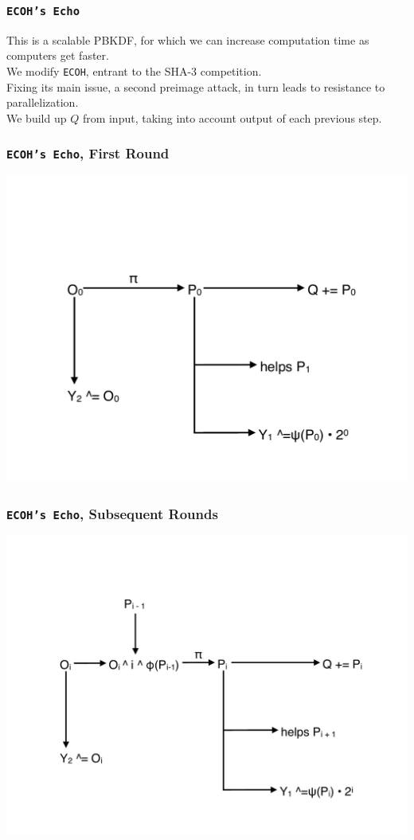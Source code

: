 \documentclass[xcolor=dvipsnames, handout]{beamer}
\begin{document}
\begin{frame}
    \frametitle{\texttt{ECOH's Echo}}
    This is a scalable PBKDF, for which we can increase computation time as
        computers get faster.\\
    We modify \texttt{ECOH}, entrant to the SHA-3 competition.\\
    Fixing its main issue, a second preimage attack, in turn leads to
        resistance to parallelization.\\
    We build up $Q$ from input, taking into account output of each previous
        step.
\end{frame}

\begin{frame}
    \frametitle{\texttt{ECOH's Echo}, First Round}
    \includegraphics[scale=0.5]{ecoh_echo.pdf}
\end{frame}

\begin{frame}
    \frametitle{\texttt{ECOH's Echo}, Subsequent Rounds}
    \includegraphics[scale=0.5]{ecoh_echo2.pdf}
\end{frame}
\end{document}
